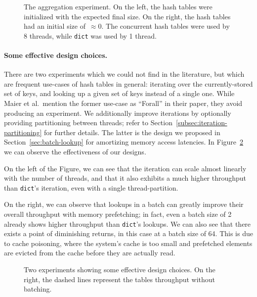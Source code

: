 \begin{figure}
    \begin{centering}
        \scalebox{0.4}{}%
        \scalebox{0.4}{}
        \caption{The aggregation experiment. On the left, the hash tables were initialized with the expected final size. On the right, the hash tables had an initial size of~$\approx$0. The concurrent hash tables were used by 8 threads, while \texttt{dict} was used by 1 thread.}
        \label{fig:aggregation}
    \end{centering}
\end{figure}

\paragraph{Some effective design choices.}
There are two experiments which we could not find in the literature, but which are frequent use-cases of hash tables in general: iterating over the currently-stored set of keys, and looking up a given set of keys instead of a single one.
While Maier et al.\ mention the former use-case as ``Forall'' in their paper, they avoid producing an experiment.
We additionally improve iterations by optionally providing partitioning between threads; refer to Section~\ref{subsec:iteration-partitioning} for further details.
The latter is the design we proposed in Section~\ref{sec:batch-lookup} for amortizing memory access latencies.
In Figure~\ref{fig:prepotenza} we can observe the effectiveness of our designs.

On the left of the Figure, we can see that the iteration can scale almost linearly with the number of threads, and that it also exhibits a much higher throughput than \texttt{dict}'s iteration, even with a single thread-partition.

On the right, we can observe that lookups in a batch can greatly improve their overall throughput with memory prefetching; in fact, even a batch size of 2 already shows higher throughput than \texttt{dict}'s lookups.
We can also see that there exists a point of diminishing returns, in this case at a batch size of 64.
This is due to cache poisoning, where the system's cache is too small and prefetched elements are evicted from the cache before they are actually read.

\begin{figure}
    \begin{centering}
        \scalebox{0.4}{}%
        \scalebox{0.4}{}
        \caption{Two experiments showing some effective design choices. On the right, the dashed lines represent the tables throughput without batching.}
        \label{fig:prepotenza}
    \end{centering}
\end{figure}

